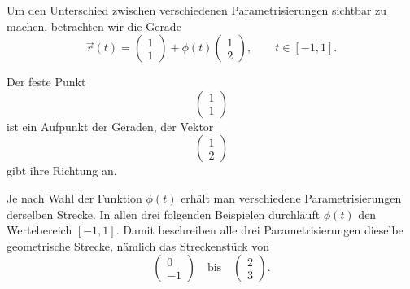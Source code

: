 Um den Unterschied zwischen verschiedenen Parametrisierungen sichtbar zu machen,
betrachten wir die Gerade
\[
\vec r(t)=
\begin{pmatrix}
	1\\
	1
\end{pmatrix}
+\phi(t)
\begin{pmatrix}
	1\\
	2
\end{pmatrix},
\qquad t\in[-1,1].
\]

Der feste Punkt
\[
\begin{pmatrix}
	1\\
	1
\end{pmatrix}
\]
ist ein Aufpunkt der Geraden,
der Vektor
\[
\begin{pmatrix}
	1\\
	2
\end{pmatrix}
\]
gibt ihre Richtung an.

Je nach Wahl der Funktion \(\phi(t)\) erhält man verschiedene Parametrisierungen derselben Strecke.
In allen drei folgenden Beispielen durchläuft \(\phi(t)\) den Wertebereich \([-1,1]\).
Damit beschreiben alle drei Parametrisierungen dieselbe geometrische Strecke,
nämlich das Streckenstück von
\[
\begin{pmatrix}
	0\\
	-1
\end{pmatrix}
\quad \text{bis} \quad
\begin{pmatrix}
	2\\
	3
\end{pmatrix}.
\]


